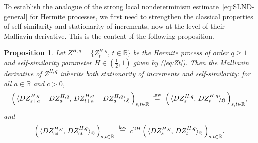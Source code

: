\documentclass[a4paper,10pt]{article}
\theoremstyle{definition}
\theoremstyle{plain}
\newtheorem{Prop}[Def]{Proposition}
\newcommand{\R}{\mathbb{R}}
\newcommand\HHH{\mathfrak{H}}
\newcommand\1{\mathbbm{1}}
\begin{document}
To establish the analogue of the strong local nondeterminism estimate~\eqref{eq:SLND-general} for Hermite processes, we first need to strengthen the classical properties of self-similarity and stationarity of increments, now at the level of their Malliavin derivative.  
This is the content of the following proposition.

\begin{Prop}\label{Prop:Zt9999}
Let $Z^{H,q}=\{Z^{H,q}_t,\,t\in\R\}$ be the Hermite process of order $q\ge1$ and self-similarity parameter $H\in(\tfrac12,1)$  given by (\ref{eq:Zt}).  
Then the Malliavin derivative of $Z^{H,q}$ inherits both stationarity of increments and self-similarity: for all $a\in\R$ and $c>0$,
\[
\Big(\,\langle DZ^{H,q}_{s+a}-DZ^{H,q}_{a},\, DZ^{H,q}_{t+a}-DZ^{H,q}_{a}\rangle_{\HHH}\,\Big)_{s,t\in\R}
\;\overset{\rm law}{=}\;
\Big(\,\langle DZ^{H,q}_{s},\, DZ^{H,q}_{t}\rangle_{\HHH}\,\Big)_{s,t\in\R},
\]
and
\[
\Big(\,\langle DZ^{H,q}_{cs},\, DZ^{H,q}_{ct}\rangle_{\HHH}\,\Big)_{s,t\in\R}
\;\overset{\rm law}{=}\; c^{2H}\,
\Big(\,\langle DZ^{H,q}_{s},\, DZ^{H,q}_{t}\rangle_{\HHH}\,\Big)_{s,t\in\R}.
\]
\end{Prop}
\end{document}
